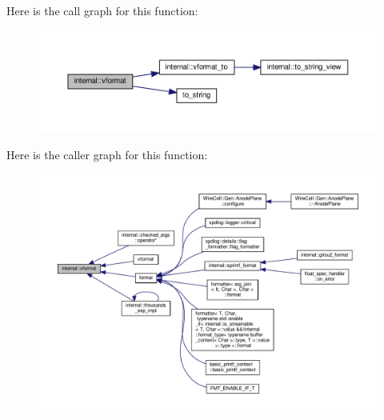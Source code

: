 Here is the call graph for this function\+:
\nopagebreak
\begin{figure}[H]
\begin{center}
\leavevmode
\includegraphics[width=350pt]{namespaceinternal_a581988072e193a0fb0f54827f1b42cfd_cgraph}
\end{center}
\end{figure}
Here is the caller graph for this function\+:
\nopagebreak
\begin{figure}[H]
\begin{center}
\leavevmode
\includegraphics[width=350pt]{namespaceinternal_a581988072e193a0fb0f54827f1b42cfd_icgraph}
\end{center}
\end{figure}
\mbox{\label{namespaceinternal_acc6b15a4992910ac85ba84aa7dfede48}} 

